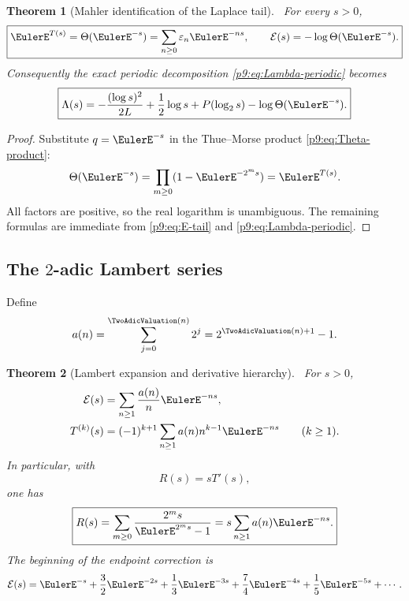 \documentclass[11pt]{article}
\numberwithin{equation}{section}
\newtheorem{theorem}{Theorem}[section]
\theoremstyle{definition}
\theoremstyle{remark}
\begin{document}
\begin{theorem}[Mahler identification of the Laplace tail]\label{p9:thm:tail-TM}
\statusN\ For every $s>0$,
\begin{equation}
 \boxed{
 \EulerE^{T(s)}=\Theta(\EulerE^{-s})
 =\sum_{n\ge0}\varepsilon_n\EulerE^{-ns},
 \qquad
 \mathcal E(s)=-\log\Theta(\EulerE^{-s}).}                      \label{p9:eq:tail-TM}
\end{equation}
Consequently the exact periodic decomposition \eqref{p9:eq:Lambda-periodic} becomes
\begin{equation}
 \boxed{
 \Lambda(s)=-\frac{(\log s)^2}{2L}+\frac12\log s
 +P(\log_2s)-\log\Theta(\EulerE^{-s}).}                         \label{p9:eq:Lambda-TM}
\end{equation}
\end{theorem}

\begin{proof}
Substitute $q=\EulerE^{-s}$ in the Thue--Morse product \eqref{p9:eq:Theta-product}:
\[
 \Theta(\EulerE^{-s})=\prod_{m\ge0}(1-\EulerE^{-2^ms})=\EulerE^{T(s)}.
\]
All factors are positive, so the real logarithm is unambiguous.  The remaining formulas are
immediate from \eqref{p9:eq:E-tail} and \eqref{p9:eq:Lambda-periodic}.
\end{proof}

\subsection{The $2$-adic Lambert series}
Define
\begin{equation}
 a(n)=\sum_{j=0}^{\TwoAdicValuation(n)}2^j=2^{\TwoAdicValuation(n)+1}-1.           \label{p9:eq:a-n}
\end{equation}

\begin{theorem}[Lambert expansion and derivative hierarchy]\label{p9:thm:Lambert-tail}
\statusN\ For $s>0$,
\begin{align}
 \mathcal E(s)&=\sum_{n\ge1}\frac{a(n)}n\EulerE^{-ns},         \label{p9:eq:E-Lambert}\\
 T^{(k)}(s)&=(-1)^{k+1}\sum_{n\ge1}a(n)n^{k-1}\EulerE^{-ns}
 \qquad(k\ge1).                                           \label{p9:eq:T-derivatives}
\end{align}
In particular, with
\begin{equation}
 R(s)=sT'(s),                                               \label{p9:eq:R-def}
\end{equation}
one has
\begin{equation}
 \boxed{
 R(s)=\sum_{m\ge0}\frac{2^ms}{\EulerE^{2^ms}-1}
 =s\sum_{n\ge1}a(n)\EulerE^{-ns}.}                             \label{p9:eq:R-Lambert}
\end{equation}
The beginning of the endpoint correction is
\begin{equation}
 \mathcal E(s)=\EulerE^{-s}+\frac32\EulerE^{-2s}+\frac13\EulerE^{-3s}
 +\frac74\EulerE^{-4s}+\frac15\EulerE^{-5s}+\cdots.               \label{p9:eq:E-first}
\end{equation}
\end{theorem}
\end{document}
